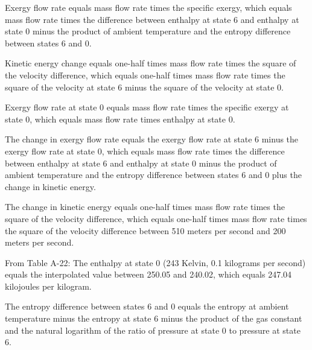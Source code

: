 Exergy flow rate equals mass flow rate times the specific exergy, which equals mass flow rate times the difference between enthalpy at state 6 and enthalpy at state 0 minus the product of ambient temperature and the entropy difference between states 6 and 0.  

Kinetic energy change equals one-half times mass flow rate times the square of the velocity difference, which equals one-half times mass flow rate times the square of the velocity at state 6 minus the square of the velocity at state 0.  

Exergy flow rate at state 0 equals mass flow rate times the specific exergy at state 0, which equals mass flow rate times enthalpy at state 0.  

The change in exergy flow rate equals the exergy flow rate at state 6 minus the exergy flow rate at state 0, which equals mass flow rate times the difference between enthalpy at state 6 and enthalpy at state 0 minus the product of ambient temperature and the entropy difference between states 6 and 0 plus the change in kinetic energy.  

The change in kinetic energy equals one-half times mass flow rate times the square of the velocity difference, which equals one-half times mass flow rate times the square of the velocity difference between 510 meters per second and 200 meters per second.  

From Table A-22:  
The enthalpy at state 0 (243 Kelvin, 0.1 kilograms per second) equals the interpolated value between 250.05 and 240.02, which equals 247.04 kilojoules per kilogram.  

The entropy difference between states 6 and 0 equals the entropy at ambient temperature minus the entropy at state 6 minus the product of the gas constant and the natural logarithm of the ratio of pressure at state 0 to pressure at state 6.